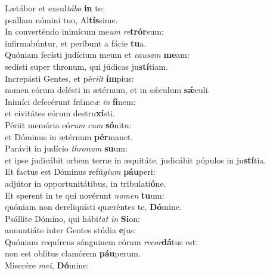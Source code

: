\evenverse Lætábor et exsul\textit{tá}\textit{bo} \textbf{in} te:~\*\\
\evenverse psallam nómini tuo, Al\textbf{tís}sime.\\
\oddverse In converténdo inimícum me\textit{um} \textit{re}\textbf{trór}sum:~\*\\
\oddverse infirmabúntur, et períbunt a fácie \textbf{tu}a.\\
\evenverse Quóniam fecísti judícium meum et \textit{cau}\textit{sam} \textbf{me}am:~\*\\
\evenverse sedísti super thronum, qui júdicas ju\textbf{stí}tiam.\\
\oddverse Increpásti Gentes, et pé\textit{ri}\textit{it} \textbf{ím}pius:~\*\\
\oddverse nomen eórum delésti in ætérnum, et in sǽculum \textbf{sǽ}culi.\\
\evenverse Inimíci defecérunt fráme\textit{æ} \textit{in} \textbf{fi}nem:~\*\\
\evenverse et civitátes eórum destru\textbf{xí}sti.\\
\oddverse Périit memória eó\textit{rum} \textit{cum} \textbf{só}nitu:~\*\\
\oddverse et Dóminus in ætérnum \textbf{pér}manet.\\
\evenverse Parávit in judício \textit{thro}\textit{num} \textbf{su}um:~\*\\
\evenverse et ipse judicábit orbem terræ in æquitáte, judicábit pópulos in ju\textbf{stí}tia.\\
\oddverse Et factus est Dóminus refú\textit{gi}\textit{um} \textbf{páu}peri:~\*\\
\oddverse adjútor in opportunitátibus, in tribulati\textbf{ó}ne.\\
\evenverse Et sperent in te qui novérunt \textit{no}\textit{men} \textbf{tu}um:~\*\\
\evenverse quóniam non dereliquísti quæréntes te, \textbf{Dó}mine.\\
\oddverse Psállite Dómino, qui hábi\textit{tat} \textit{in} \textbf{Si}on:~\*\\
\oddverse annuntiáte inter Gentes stúdia \textbf{e}jus:\\
\evenverse Quóniam requírens sánguinem eórum \textit{re}\textit{cor}\textbf{dá}tus est:~\*\\
\evenverse non est oblítus clamórem \textbf{páu}perum.\\
\oddverse Miserére \textit{me}\textit{i}, \textbf{Dó}mine:~\*\\
